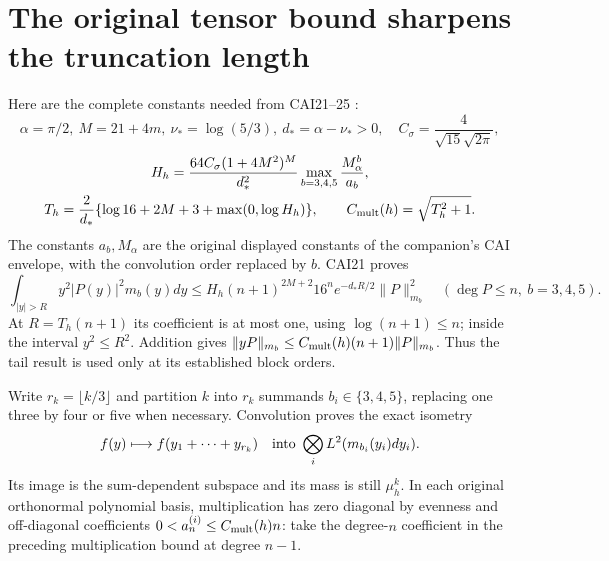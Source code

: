 \documentclass[11pt]{article}
\begin{document}
\section{The original tensor bound sharpens the truncation length}
Here are the complete constants needed from CAI21--25 \cite{CAI}:
\[
 \alpha=\pi/2,\ M=21+4m,\ \nu_*=\log(5/3),\ d_* =\alpha-\nu_*>0,
 \quad C_\sigma=\frac4{\sqrt{15}\sqrt{2\pi}},
\]
\[
 \begin{gathered}
 H_h=\frac{64C_\sigma(1+4M^2)^M}{d_*^2}
             \max_{b=3,4,5}\frac{M_\alpha^b}{a_b},\\
 T_h=\frac2{d_*}\{\log16+2M+3+\max(0,\log H_h)\},\qquad
 C_{\rm mult}(h)=\sqrt{T_h^2+1}.
 \end{gathered}
\]
The constants $a_b,M_\alpha$ are the original displayed constants
of the companion's CAI envelope, with the convolution order replaced
by $b$. CAI21 proves
\[
 \int_{|y|>R}y^2|P(y)|^2m_b(y)dy
 \le H_h(n+1)^{2M+2}16^ne^{-d_*R/2}\|P\|_{m_b}^2
 \quad(\deg P\le n,\ b=3,4,5).
\]
At $R=T_h(n+1)$ its coefficient is at most one, using
$\log(n+1)\le n$; inside the interval $y^2\le R^2$. Addition gives
$\|yP\|_{m_b}\le C_{\rm mult}(h)(n+1)\|P\|_{m_b}$.
Thus the tail result is used only at its established block orders.

Write $r_k=\lfloor k/3\rfloor$ and partition $k$ into $r_k$
summands $b_i\in\{3,4,5\}$, replacing one three by four or five
when necessary. Convolution proves the exact isometry
\[
 f(y)\longmapsto f(y_1+\cdots+y_{r_k})
 \quad\hbox{into }\bigotimes_iL^2(m_{b_i}(y_i)dy_i).
\]
Its image is the sum-dependent subspace and its mass is still
$\mu_h^k$. In each original orthonormal polynomial basis,
multiplication has zero diagonal by evenness and off-diagonal
coefficients $0<a_n^{(i)}\le C_{\rm mult}(h)n$: take the degree-$n$
coefficient in the preceding multiplication bound at degree $n-1$.
\end{document}

